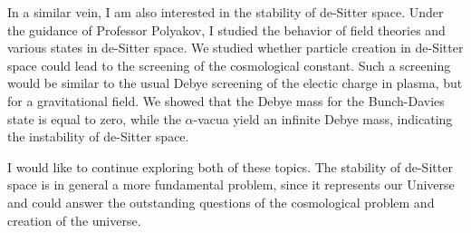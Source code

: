 \documentclass[11pt]{article}
\begin{document}
In a similar vein, I am also interested in the stability of de-Sitter space. Under the guidance of Professor Polyakov, I studied the behavior of field theories and various states in de-Sitter space. We studied whether particle creation in de-Sitter space could lead to the screening of the cosmological constant. Such a screening would be similar to the usual Debye screening of the electic charge in  plasma, but for a gravitational field. We showed that the Debye mass for the Bunch-Davies state is equal to zero, while the $\alpha$-vacua yield an infinite Debye mass, indicating the instability of de-Sitter space.


I would like to continue exploring both of these topics. %
The stability of de-Sitter space is in general a more fundamental problem, since it represents our Universe and could answer the outstanding questions of the cosmological problem and creation of the universe.
\end{document}
